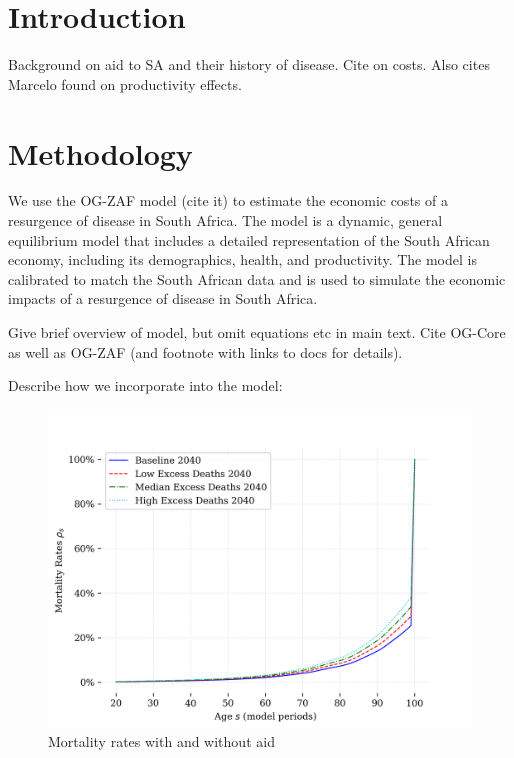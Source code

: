 \documentclass[letterpaper,12pt]{article}
\theoremstyle{definition}
\begin{document}
\begin{spacing}{1.5}


\newpage

\section{Introduction}\label{SecIntro}

Background on aid to SA and their history of disease.  Cite \cite{KS2025} on costs.  Also cites Marcelo found on productivity effects.

\section{Methodology}\label{SecMethod}

We use the OG-ZAF model (cite it) to estimate the economic costs of a resurgence of disease in South Africa.  The model is a dynamic, general equilibrium model that includes a detailed representation of the South African economy, including its demographics, health, and productivity.  The model is calibrated to match the South African data and is used to simulate the economic impacts of a resurgence of disease in South Africa.

Give brief overview of model, but omit equations etc in main text.  Cite OG-Core as well as OG-ZAF (and footnote with links to docs for details).

Describe how we incorporate \cite{KS2025} into the model:

\begin{figure}[h]
    \caption{Mortality rates with and without aid}
    \centering
    \includegraphics[scale=0.75]{./tables_figures/mortality_rates.png}
\end{figure}


\end{spacing}
\end{document}
